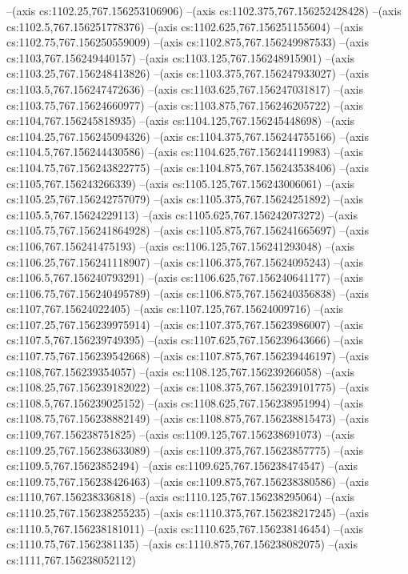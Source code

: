 --(axis cs:1102.25,767.156253106906)
--(axis cs:1102.375,767.156252428428)
--(axis cs:1102.5,767.156251778376)
--(axis cs:1102.625,767.156251155604)
--(axis cs:1102.75,767.156250559009)
--(axis cs:1102.875,767.156249987533)
--(axis cs:1103,767.156249440157)
--(axis cs:1103.125,767.156248915901)
--(axis cs:1103.25,767.156248413826)
--(axis cs:1103.375,767.156247933027)
--(axis cs:1103.5,767.156247472636)
--(axis cs:1103.625,767.156247031817)
--(axis cs:1103.75,767.15624660977)
--(axis cs:1103.875,767.156246205722)
--(axis cs:1104,767.156245818935)
--(axis cs:1104.125,767.156245448698)
--(axis cs:1104.25,767.156245094326)
--(axis cs:1104.375,767.156244755166)
--(axis cs:1104.5,767.156244430586)
--(axis cs:1104.625,767.156244119983)
--(axis cs:1104.75,767.156243822775)
--(axis cs:1104.875,767.156243538406)
--(axis cs:1105,767.156243266339)
--(axis cs:1105.125,767.156243006061)
--(axis cs:1105.25,767.156242757079)
--(axis cs:1105.375,767.15624251892)
--(axis cs:1105.5,767.15624229113)
--(axis cs:1105.625,767.156242073272)
--(axis cs:1105.75,767.156241864928)
--(axis cs:1105.875,767.156241665697)
--(axis cs:1106,767.156241475193)
--(axis cs:1106.125,767.156241293048)
--(axis cs:1106.25,767.156241118907)
--(axis cs:1106.375,767.15624095243)
--(axis cs:1106.5,767.156240793291)
--(axis cs:1106.625,767.156240641177)
--(axis cs:1106.75,767.156240495789)
--(axis cs:1106.875,767.156240356838)
--(axis cs:1107,767.15624022405)
--(axis cs:1107.125,767.15624009716)
--(axis cs:1107.25,767.156239975914)
--(axis cs:1107.375,767.15623986007)
--(axis cs:1107.5,767.156239749395)
--(axis cs:1107.625,767.156239643666)
--(axis cs:1107.75,767.156239542668)
--(axis cs:1107.875,767.156239446197)
--(axis cs:1108,767.156239354057)
--(axis cs:1108.125,767.156239266058)
--(axis cs:1108.25,767.156239182022)
--(axis cs:1108.375,767.156239101775)
--(axis cs:1108.5,767.156239025152)
--(axis cs:1108.625,767.156238951994)
--(axis cs:1108.75,767.156238882149)
--(axis cs:1108.875,767.156238815473)
--(axis cs:1109,767.156238751825)
--(axis cs:1109.125,767.156238691073)
--(axis cs:1109.25,767.156238633089)
--(axis cs:1109.375,767.15623857775)
--(axis cs:1109.5,767.15623852494)
--(axis cs:1109.625,767.156238474547)
--(axis cs:1109.75,767.156238426463)
--(axis cs:1109.875,767.156238380586)
--(axis cs:1110,767.156238336818)
--(axis cs:1110.125,767.156238295064)
--(axis cs:1110.25,767.156238255235)
--(axis cs:1110.375,767.156238217245)
--(axis cs:1110.5,767.156238181011)
--(axis cs:1110.625,767.156238146454)
--(axis cs:1110.75,767.1562381135)
--(axis cs:1110.875,767.156238082075)
--(axis cs:1111,767.156238052112)
